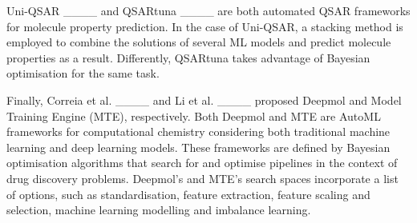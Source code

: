 Uni-QSAR ____ and QSARtuna ____ are both automated QSAR frameworks for molecule property prediction. In the case of Uni-QSAR, a stacking method is employed to combine the solutions of several ML models and predict molecule properties as a result. Differently, QSARtuna takes advantage of Bayesian optimisation for the same task.

Finally, Correia et al. ____ and Li et al. ____ proposed Deepmol and Model Training Engine (MTE), respectively. Both Deepmol and MTE are AutoML frameworks for computational chemistry considering both traditional machine learning and deep learning models. These frameworks are defined by Bayesian optimisation algorithms that search for and optimise pipelines in the context of drug discovery problems. Deepmol's and MTE's search spaces incorporate a list of options, such as standardisation, feature extraction, feature scaling and selection, machine learning modelling and imbalance learning.